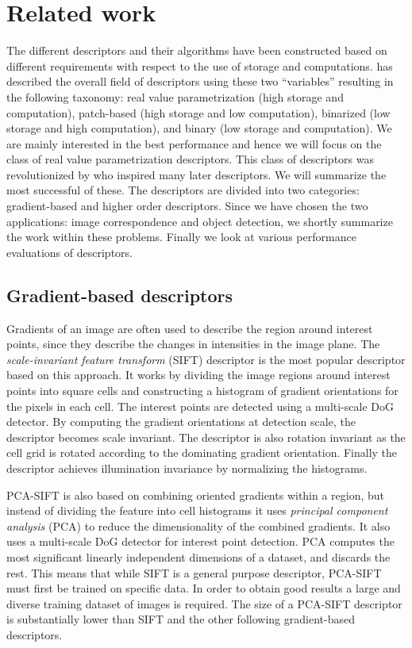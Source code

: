 \documentclass[thesis.tex]{subfiles}
\begin{document}
\chapter{Related work}
The different descriptors and their algorithms have been constructed based on different requirements with respect to the use of storage and computations. \cite{heinly2012comparative} has described the overall field of descriptors using these two ``variables'' resulting in the following taxonomy: real value parametrization (high storage and computation), patch-based (high storage and low computation), binarized (low storage and high computation), and binary (low storage and computation). We are mainly interested in the best performance and hence we will focus on the class of real value parametrization descriptors. This class of descriptors was revolutionized by \citet{lowe2004distinctive} who inspired many later descriptors. We will summarize the most successful of these. The descriptors are divided into two categories: gradient-based and higher order descriptors. Since we have chosen the two applications: image correspondence and object detection, we shortly summarize the work within these problems. Finally we look at various performance evaluations of descriptors.

\section{Gradient-based descriptors}
\label{sec:gradientDescriptors}
Gradients of an image are often used to describe the region around interest points, since they describe the changes in intensities in the image plane. The \emph{scale-invariant feature transform} (SIFT) descriptor \cite{lowe2004distinctive} is the most popular descriptor based on this approach. It works by dividing the image regions around interest points into square cells and constructing a histogram of gradient orientations for the pixels in each cell. The interest points are detected using a multi-scale DoG detector. By computing the gradient orientations at detection scale, the descriptor becomes scale invariant. The descriptor is also rotation invariant as the cell grid is rotated according to the dominating gradient orientation. Finally the descriptor achieves illumination invariance by normalizing the histograms.

PCA-SIFT \cite{ke2004pca} is also based on combining oriented gradients within a region, but instead of dividing the feature into cell histograms it uses \emph{principal component analysis} (PCA) to reduce the dimensionality of the combined gradients. It also uses a multi-scale DoG detector for interest point detection. PCA computes the most significant linearly independent dimensions of a dataset, and discards the rest. This means that while SIFT is a general purpose descriptor, PCA-SIFT must first be trained on specific data. In order to obtain good results a large and diverse training dataset of images is required. The size of a PCA-SIFT descriptor is substantially lower than SIFT and the other following gradient-based descriptors.
\end{document}
